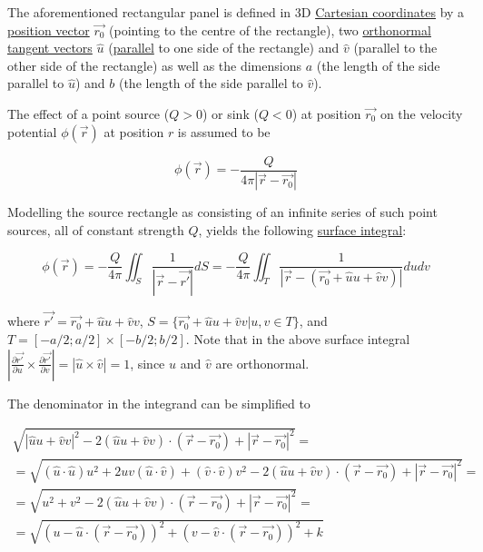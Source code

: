 ﻿\documentclass{article}
\begin{document}
The aforementioned rectangular panel is defined in 3D \href{https://en.wikipedia.org/wiki/Cartesian_coordinate_system}{Cartesian coordinates} by a \href{https://en.wikipedia.org/wiki/Position_(geometry)}{position vector} $\vec{r_0}$ (pointing to the centre of the rectangle), two \href{https://en.wikipedia.org/wiki/Orthonormality}{orthonormal} \href{https://en.wikipedia.org/wiki/Tangent_vector}{tangent vectors} $\hat{u}$ (\href{https://en.wikipedia.org/wiki/Parallel_(geometry)}{parallel} to one side of the rectangle) and $\hat{v}$ (parallel to the other side of the rectangle) as well as the dimensions $a$ (the length of the side parallel to $\hat{u}$) and $b$ (the length of the side parallel to $\hat{v}$).

The effect of a point source ($Q > 0$) or sink ($Q < 0$) at position $\vec{r_0}$ on the velocity potential $\phi(\vec{r})$ at position $r$ is assumed to be

\begin{equation}
    \label{eq:EffectOfPointSourceOnVelocityPotential}
    \phi(\vec{r}) = - \frac{Q}{4 \pi |\vec{r} - \vec{r_0}|}
\end{equation}

Modelling the source rectangle as consisting of an infinite series of such point sources, all of constant strength $Q$, yields the following \href{https://en.wikipedia.org/wiki/Surface_integral}{surface integral}:

\begin{equation}
    \label{eq:EffectOfARectangularSourcePanelOnVelocityPotential}
    \phi(\vec{r}) = - \frac{Q}{4 \pi} \iint_S \frac{1}{|\vec{r} - \vec{r'}|} dS = - \frac{Q}{4 \pi} \iint_T \frac{1}{|\vec{r} - (\vec{r_0} + \hat{u} u + \hat{v} v)|} du dv
\end{equation}

where $\vec{r'} = \vec{r_0} + \hat{u} u + \hat{v} v$, $S = \{ \vec{r_0} + \hat{u} u + \hat{v} v | u, v \in T \}$, and $T = [- a / 2; a / 2] \times [- b / 2; b / 2]$. Note that in the above surface integral $|\frac{\partial \vec{r'}}{\partial u} \times \frac{\partial \vec{r'}}{\partial v}| = |\hat{u} \times \hat{v}| = 1$, since $\hat{u}$ and $\hat{v}$ are orthonormal.

The denominator in the integrand can be simplified to

\begin{multline*}
    \sqrt{|\hat{u} u + \hat{v} v|^2 - 2 (\hat{u} u + \hat{v} v) \cdot (\vec{r} - \vec{r_0}) + |\vec{r} - \vec{r_0}|^2} = \\
    = \sqrt{(\hat{u} \cdot \hat{u}) u^2 + 2 uv (\hat{u} \cdot \hat{v}) + (\hat{v} \cdot \hat{v}) v^2 - 2 (\hat{u} u + \hat{v} v) \cdot (\vec{r} - \vec{r_0}) + |\vec{r} - \vec{r_0}|^2} = \\
    = \sqrt{u^2 + v^2 - 2 (\hat{u} u + \hat{v} v) \cdot (\vec{r} - \vec{r_0}) + |\vec{r} - \vec{r_0}|^2} = \\
    = \sqrt{(u - \hat{u} \cdot (\vec{r} - \vec{r_0}))^2 + (v - \hat{v} \cdot (\vec{r} - \vec{r_0}))^2 + k}
\end{multline*}
\end{document}
